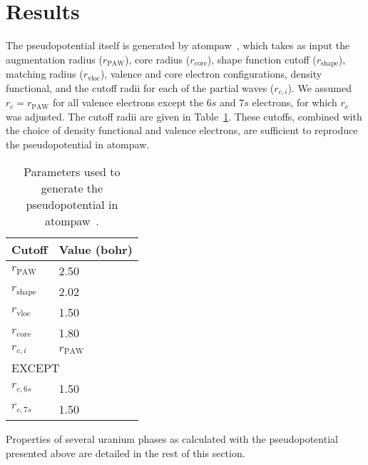 \section{Results}
The pseudopotential itself is generated by
atompaw~\cite{holzwarth2001projector,tackett2001projector}, which takes as
input the augmentation radius ($r_\text{PAW}$), core radius ($r_\text{core}$),
shape function cutoff ($r_\text{shape}$), matching radius ($r_\text{vloc}$),
valence and core electron configurations, density functional, and the
cutoff radii for each of the partial waves ($r_{c,i}$). We assumed
$r_c = r_\text{PAW}$ for all valence electrons except the $6s$ and $7s$
electrons, for which $r_c$ was adjusted. The cutoff radii are given in
Table~\ref{table:pseudopotential}.
These cutoffs, combined with the choice of density functional and valence
electrons, are sufficient to reproduce the pseudopotential in atompaw.
\begin{table}
  \caption[Parameters used to generate the pseudopotential in
    atompaw]{Parameters used to generate the pseudopotential in
    atompaw~\cite{holzwarth2001projector,tackett2001projector}.}
  \label{table:pseudopotential}
  \centering
  \begin{tabular}{l l}
    \hline
    Cutoff & Value (bohr) \\
    \hline
    $r_\text{PAW}^{}$   & 2.50 \\
    $r_\text{shape}^{}$ & 2.02 \\
    $r_\text{vloc}^{}$  & 1.50 \\
    $r_\text{core}^{}$  & 1.80 \\
    \hline
    $r_{c,i}^{}$ & $r_\text{PAW}$ \\
    \multicolumn{2}{l}{\quad EXCEPT} \\
    $r_{c,6s}^{}$       & 1.50 \\
    $r_{c,7s}^{}$       & 1.50 \\
    \hline
  \end{tabular}
\end{table}




Properties of several uranium phases as calculated with the pseudopotential
presented above are detailed in the rest of this section.

